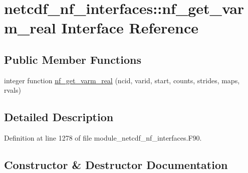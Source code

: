 \hypertarget{interfacenetcdf__nf__interfaces_1_1nf__get__varm__real}{}\section{netcdf\+\_\+nf\+\_\+interfaces\+:\+:nf\+\_\+get\+\_\+varm\+\_\+real Interface Reference}
\label{interfacenetcdf__nf__interfaces_1_1nf__get__varm__real}
\subsection*{Public Member Functions}
\begin{DoxyCompactItemize}
\item 
integer function \hyperlink{interfacenetcdf__nf__interfaces_1_1nf__get__varm__real_a21c983130385143e0ecb39f8ac37912d}{nf\+\_\+get\+\_\+varm\+\_\+real} (ncid, varid, start, counts, strides, maps, rvals)
\end{DoxyCompactItemize}


\subsection{Detailed Description}


Definition at line 1278 of file module\+\_\+netcdf\+\_\+nf\+\_\+interfaces.\+F90.



\subsection{Constructor \& Destructor Documentation}
\mbox{\label{interfacenetcdf__nf__interfaces_1_1nf__get__varm__real_a21c983130385143e0ecb39f8ac37912d}} 
